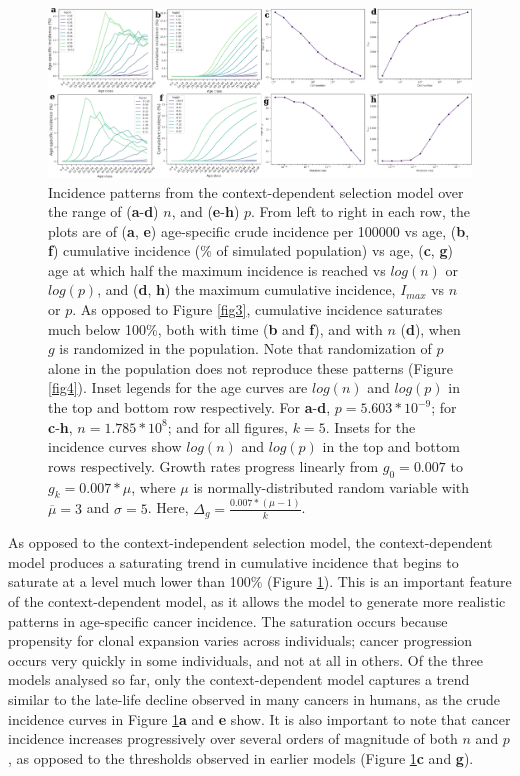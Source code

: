 \documentclass[12pt,onecolumn,twoside]{article}
\begin{document}
\begin{figure}[!h]
	\centering
	\includegraphics[width=\linewidth, keepaspectratio=true]{fig5.png}
	\caption{Incidence patterns from the context-dependent selection model over the range of (\textbf{a}-\textbf{d}) $n$, and (\textbf{e}-\textbf{h}) $p$. From left to right in each row, the plots are of (\textbf{a}, \textbf{e}) age-specific crude incidence per 100000 vs age, (\textbf{b}, \textbf{f}) cumulative incidence (\% of simulated population) vs age, (\textbf{c}, \textbf{g}) age at which half the maximum incidence is reached vs $log(n)$ or $log(p)$, and (\textbf{d}, \textbf{h}) the maximum cumulative incidence, $I_{max}$ vs $n$ or $p$. As opposed to Figure \ref{fig3}, cumulative incidence saturates much below 100\%, both with time (\textbf{b} and \textbf{f}), and with $n$ (\textbf{d}), when $g$ is randomized in the population. Note that randomization of $p$ alone in the population does not reproduce these patterns (Figure \ref{fig4}). Inset legends for the age curves are $log(n)$ and $log(p)$ in the top and bottom row respectively. For \textbf{a}-\textbf{d}, $p=5.603*10^{-9}$; for \textbf{c}-\textbf{h}, $n=1.785*10^{8}$; and for all figures, $k=5$. Insets for the incidence curves show $log(n)$ and $log(p)$ in the top and bottom rows respectively. Growth rates progress linearly from $g_{0}=0.007$ to $g_{k}=0.007*\mu$, where $\mu$ is normally-distributed random variable with $\overline{\mu}=3$ and $\sigma=5$. Here, $\Delta_{g}=\frac{0.007*(\mu-1)}{k}$.}
	\label{fig5}
\end{figure} 

As opposed to the context-independent selection model, the context-dependent model produces a saturating trend in cumulative incidence that begins to saturate at a level much lower than 100\% (Figure \ref{fig5}). This is an important feature of the context-dependent model, as it allows the model to generate more realistic patterns in age-specific cancer incidence. The saturation occurs because propensity for clonal expansion varies across individuals; cancer progression occurs very quickly in some individuals, and not at all in others. Of the three models analysed so far, only the context-dependent model captures a trend similar to the late-life decline observed in many cancers in humans, as the crude incidence curves in Figure \ref{fig5}\textbf{a} and \textbf{e} show. It is also important to note that cancer incidence increases progressively over several orders of magnitude of both $n$ and $p$, as opposed to the thresholds observed in earlier models (Figure \ref{fig5}\textbf{c} and \textbf{g}).
\end{document}

